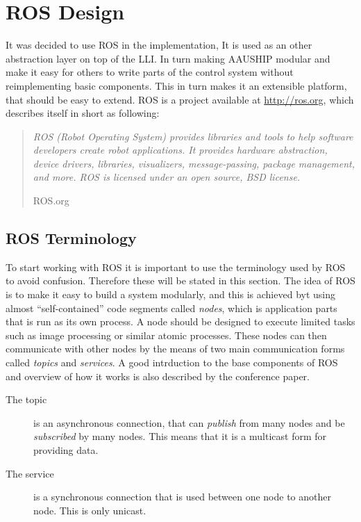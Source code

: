 \chapter{\acs{ROS} Design}

It was decided to use \ac{ROS} in the implementation, It is used as an
other abstraction layer on top of the \ac{LLI}. In turn making AAUSHIP
modular and make it easy for others to write parts of the control
system without reimplementing basic components. This in turn makes it
an extensible platform, that should be easy to extend. \ac{ROS} is a
project available at \url{http://ros.org}, which describes itself in
short as following:

\begin{quote}
\textit{\noindent
	ROS (Robot Operating System) provides libraries and
	tools to help software developers create robot applications. It
	provides hardware abstraction, device drivers, libraries,
	visualizers, message-passing, package management, and more. ROS is
	licensed under an open source, BSD license.
}
		
	\hfill ROS.org
\end{quote}

\section{\acs{ROS} Terminology}
To start working with \ac{ROS} it is important to use the terminology
used by \ac{ROS} to avoid confusion. Therefore these  will be stated
in this section.  The idea of \ac{ROS} is to make it easy to build a
system modularly, and this is achieved byt using almost
``self-contained'' code segments called \textit{nodes}, which is
application parts that is run as its own process. A node should be
designed to execute limited tasks such as image processing or similar
atomic processes. These nodes can then communicate with other nodes by
the means of two main communication forms called \textit{topics} and
\textit{services}. A good intrduction to the base components of \ac{ROS}
and overview of how it works is also described by the
\citep{rosoverview} conference paper.

\begin{description}
\item[The topic] is an asynchronous connection, that can \textit{publish}
from many nodes and be \textit{subscribed} by many nodes. This means
that it is a multicast form for providing data.
\item[The service] is a synchronous connection that is used between one node
to another node. This is only unicast.
\end{description}

